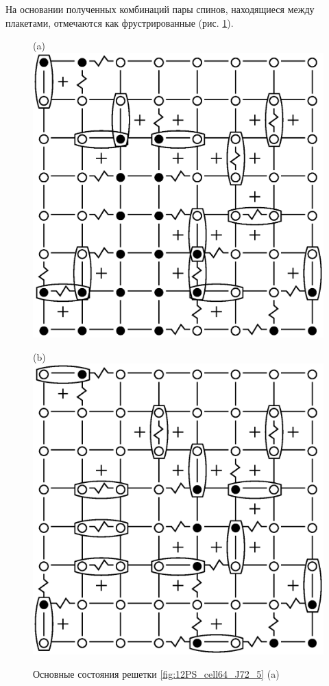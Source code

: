 \documentclass[utf8, babel, sor, jor, amsmath, amssymb, reprint]{elsarticle} %
\begin{document}
На основании полученных комбинаций пары спинов, находящиеся между плакетами, отмечаются как фрустрированные (рис. \ref{fig:12F_cell64_J72_5}).

\begin{figure}[H]
	\centering
	\begin{minipage}[h]{0.3\linewidth}
		\centering(a)
		\includegraphics[width=1\linewidth]{pictures/1Conf_cell64_J72_5.eps}
	\end{minipage}
	\hspace{15pt}
	\begin{minipage}[h]{0.3\linewidth}
		\centering(b)
		\includegraphics[width=1\linewidth]{pictures/2Conf_cell64_J72_5.eps}
	\end{minipage}
	\caption{Основные состояния решетки \ref{fig:12PS_cell64_J72_5} (a)}
	\label{fig:12F_cell64_J72_5}
\end{figure}
\end{document}
